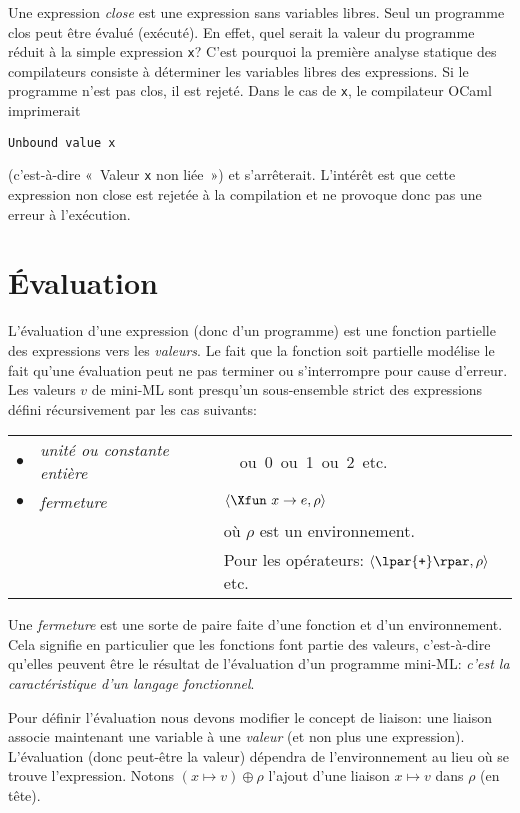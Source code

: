 
Une expression \emph{close} est une expression sans variables
libres. Seul un programme clos peut être évalué (exécuté). En effet,
quel serait la valeur du programme réduit à la simple expression
\verb|x|? C'est pourquoi la première analyse statique des compilateurs consiste à déterminer les variables libres des expressions. Si le programme
n'est pas clos, il est rejeté. Dans le cas de \verb|x|, le compilateur
OCaml imprimerait 
\begin{center}
\texttt{Unbound value x}
\end{center}
(c'est-à-dire «~Valeur \texttt{x} non liée~») et s'arrêterait. L'intérêt est que cette expression non close est rejetée à la compilation et ne provoque donc pas une erreur à l'exécution.

\section{Évaluation}

L'évaluation d'une expression (donc d'un programme) est une fonction partielle des expressions vers les \emph{valeurs}. Le fait que la fonction soit partielle modélise le fait qu'une évaluation peut ne pas terminer ou s'interrompre pour cause d'erreur. Les valeurs $v$ de mini-ML sont presqu'un sous-ensemble strict des expressions défini récursivement par les cas suivants:

\begin{tabular}{rll}
    $\bullet$
  & \emph{unité ou constante entière}
  & \unit \ ou \textsf{0} ou \textsf{1} ou \textsf{2} etc.\\
    $\bullet$
  & \emph{fermeture}
  & $\langle\Xfun \,\, x \rightarrow e, \rho\rangle$\\
 && où $\rho$ est un environnement.\\
  & 
  & Pour les opérateurs: $\langle\lpar{\texttt{+}}\rpar, \rho\rangle$ etc.
\end{tabular}

Une \emph{fermeture} est une sorte de paire faite d'une fonction et
d'un environnement. Cela signifie en particulier que les fonctions
font partie des valeurs, c'est-à-dire qu'elles peuvent être le
résultat de l'évaluation d'un programme mini-ML: \emph{c'est la
  caractéristique d'un langage fonctionnel}.

Pour définir l'évaluation nous devons modifier le concept de liaison: une liaison associe maintenant une variable à une \emph{valeur} (et non plus une expression). L'évaluation (donc peut-être la valeur) dépendra de l'environnement au lieu où se trouve l'expression. Notons $(x \mapsto v) \oplus \rho$ l'ajout d'une liaison $x \mapsto v$ dans $\rho$ (en tête).

